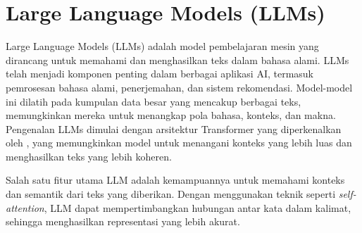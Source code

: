 \section{Large Language Models (LLMs)}
\label{sec:llms}

Large Language Models (LLMs) adalah model pembelajaran mesin yang dirancang untuk memahami dan menghasilkan teks dalam bahasa alami. LLMs telah menjadi komponen penting dalam berbagai aplikasi AI, termasuk pemrosesan bahasa alami, penerjemahan, dan sistem rekomendasi. Model-model ini dilatih pada kumpulan data besar yang mencakup berbagai teks, memungkinkan mereka untuk menangkap pola bahasa, konteks, dan makna. Pengenalan LLMs dimulai dengan arsitektur Transformer yang diperkenalkan oleh \textcite{vaswani2023attentionneed}, yang memungkinkan model untuk menangani konteks yang lebih luas dan menghasilkan teks yang lebih koheren.

Salah satu fitur utama LLM adalah kemampuannya untuk memahami konteks dan semantik dari teks yang diberikan. Dengan menggunakan teknik seperti \textit{self-attention}, LLM dapat mempertimbangkan hubungan antar kata dalam kalimat, sehingga menghasilkan representasi yang lebih akurat. 